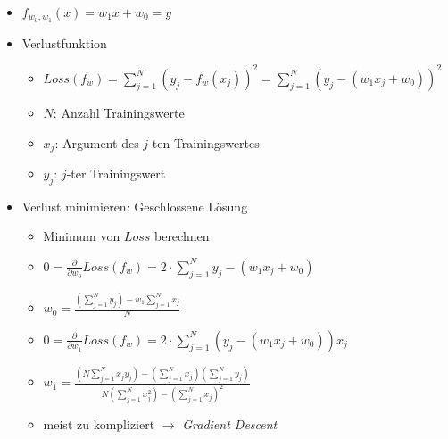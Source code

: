 \documentclass[nonacm=true, language=german]{acmart}
\begin{document}
\begin{itemize}
    \item $ f_{w_0, w_1}(x) = w_1x + w_0 = y $
    \item Verlustfunktion
    \begin{itemize}
        \item $ \displaystyle Loss(f_w) = \sum_{j = 1}^N(y_j - f_w(x_j))^2 = \sum_{j = 1}^N(y_j - (w_1x_j + w_0))^2 $
        \item $N$: Anzahl Trainingswerte
        \item $x_j$: Argument des $j$-ten Trainingswertes
        \item $y_j$: $j$-ter Trainingswert
    \end{itemize}
    
    \item Verlust minimieren: Geschlossene Lösung
    \begin{itemize}
        \item Minimum von $Loss$ berechnen
        \item $ \displaystyle 0 = \frac{\partial}{\partial w_0} Loss(f_w) = 2 \cdot \sum_{j = 1}^N y_j - (w_1x_j + w_0) $
        \item $ w_0 = \frac{\displaystyle (\sum_{j = 1}^N y_j) - w_1 \sum_{j = 1}^N x_j}{N} $
        \item $ \displaystyle 0 = \frac{\partial}{\partial w_1} Loss(f_w) = 2 \cdot \sum_{j = 1}^N (y_j - (w_1x_j + w_0))x_j $
        \item $ w_1 = \frac{\displaystyle (N \sum_{j = 1}^N x_jy_j) - (\sum_{j = 1}^N x_j) (\sum_{j = 1}^N y_j)}{\displaystyle N (\sum_{j = 1}^N x_j^2) - (\sum_{j = 1}^N x_j)^2} $
        \item meist zu kompliziert $\rightarrow$ \textit{Gradient Descent}
    \end{itemize}
    

\end{itemize}
\end{document}
